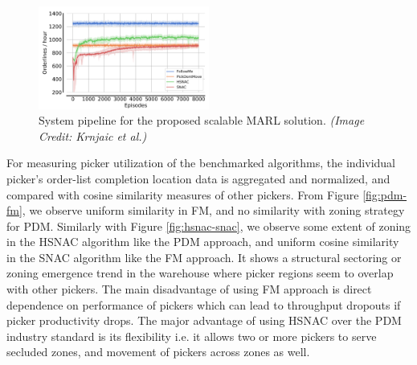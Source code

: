 \documentclass{article}
\begin{document}
\begin{figure}[h]
    \centering
    \includegraphics[width=0.5\textwidth]{rl-result-curve.png}
    \caption{System pipeline for the proposed scalable MARL solution. \textit{(Image Credit: Krnjaic et al.)}}
    \label{fig:scale-learn-curve}
\end{figure}


For measuring picker utilization of the benchmarked algorithms, the individual picker’s order-list completion location data is aggregated and normalized, and compared with cosine similarity measures of other pickers.
From Figure \ref{fig:pdm-fm}, we observe uniform similarity in FM, and no similarity with zoning strategy for PDM.
Similarly with Figure \ref{fig:hsnac-snac}, we observe some extent of zoning in the HSNAC algorithm like the PDM approach, and uniform cosine similarity in the SNAC algorithm like the FM approach.
It shows a structural sectoring or zoning emergence trend in the warehouse where picker regions seem to overlap with other pickers.
The main disadvantage of using FM approach is direct dependence on performance of pickers which can lead to throughput dropouts if picker productivity drops.
The major advantage of using HSNAC over the PDM industry standard is its flexibility i.e. it allows two or more pickers to serve secluded zones, and movement of pickers across zones as well.
\end{document}

